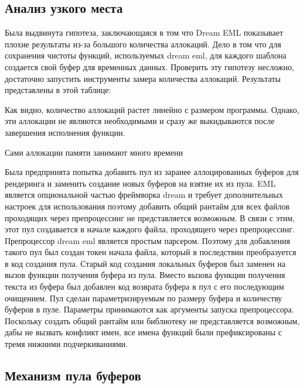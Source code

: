 \subsection{Анализ узкого места}

Была выдвинута гипотеза, заключающаяся в том что Dream EML показывает плохие результаты из-за большого количества аллокаций. %
Дело в том что для сохранения чистоты функций, используемых dream eml, для каждого шаблона создается свой буфер для временных данных.
Проверить эту гипотезу несложно, достаточно запустить инструменты замера количества аллокаций. Результаты представлены в этой таблице:


Как видно, количество аллокаций растет линейно с размером программы.
Однако, эти аллокации не являются необходимыми и сразу же выкидываются после завершения исполнения функции.

Сами аллокации памяти занимают много времени %

Была предпринята попытка добавить пул из заранее аллоцированных буферов для рендеринга и заменить создание новых буферов на взятие их из пула.
EML является опциональной частью фреймворка dream и требует дополнительных настроек для использования %
поэтому добавить общий рантайм для всех файлов проходящих через препроцессинг не представляется возможным.
В связи с этим, этот пул создавается в начале каждого файла, проходящего через препроцессинг.
Препроцессор dream eml является простым парсером.
Поэтому для добавления такого пул был создан токен начала файла, который в последствии преобразуется в код создания пула.
Старый код создания локальных буферов был заменен на вызов функции получения буфера из пула.
Вместо вызова функции получения текста из буфера был добавлен код возврата буфера в пул с его последующим очищением.
Пул сделан параметризируемым по размеру буфера и количеству буферов в пуле.
Параметры принимаются как аргументы запуска препроцессора. %
Поскольку создать общий рантайм или библиотеку не представляется возможным, дабы не вызвать конфликт имен, все имена функций были префиксированы с тремя нижними подчеркиваниями.

\subsection{Механизм пула буферов}

